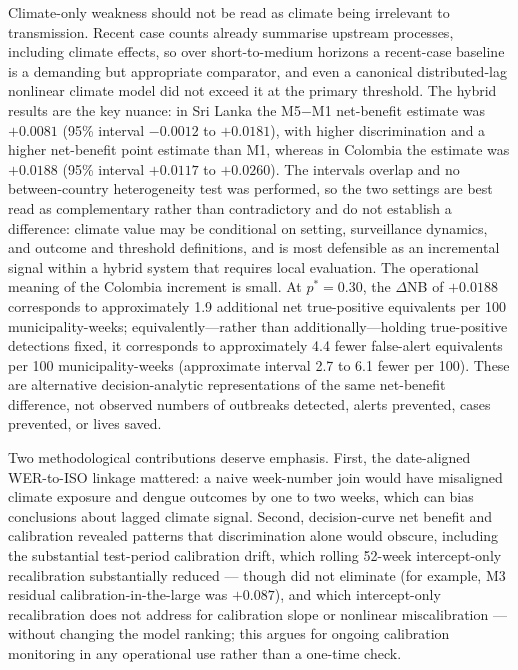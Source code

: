 \documentclass[11pt,a4paper]{article}
\begin{document}
Climate-only weakness should not be read as climate being irrelevant to transmission. Recent case counts already summarise upstream processes, including climate effects, so over short-to-medium horizons a recent-case baseline is a demanding but appropriate comparator, and even a canonical distributed-lag nonlinear climate model did not exceed it at the primary threshold. The hybrid results are the key nuance: in Sri Lanka the M5$-$M1 net-benefit estimate was $+0.0081$ (95\% interval $-0.0012$ to $+0.0181$), with higher discrimination and a higher net-benefit point estimate than M1, whereas in Colombia the estimate was $+0.0188$ (95\% interval $+0.0117$ to $+0.0260$). The intervals overlap and no between-country heterogeneity test was performed, so the two settings are best read as complementary rather than contradictory and do not establish a difference: climate value may be conditional on setting, surveillance dynamics, and outcome and threshold definitions, and is most defensible as an incremental signal within a hybrid system that requires local evaluation. The operational meaning of the Colombia increment is small. At $p^*=0.30$, the $\Delta$NB of $+0.0188$ corresponds to approximately 1.9 additional net true-positive equivalents per 100 municipality-weeks; equivalently---rather than additionally---holding true-positive detections fixed, it corresponds to approximately 4.4 fewer false-alert equivalents per 100 municipality-weeks (approximate interval 2.7 to 6.1 fewer per 100). These are alternative decision-analytic representations of the same net-benefit difference, not observed numbers of outbreaks detected, alerts prevented, cases prevented, or lives saved.

Two methodological contributions deserve emphasis. First, the date-aligned WER-to-ISO linkage mattered: a naive week-number join would have misaligned climate exposure and dengue outcomes by one to two weeks, which can bias conclusions about lagged climate signal. Second, decision-curve net benefit and calibration revealed patterns that discrimination alone would obscure, including the substantial test-period calibration drift, which rolling 52-week intercept-only recalibration substantially reduced --- though did not eliminate (for example, M3 residual calibration-in-the-large was $+0.087$), and which intercept-only recalibration does not address for calibration slope or nonlinear miscalibration --- without changing the model ranking; this argues for ongoing calibration monitoring in any operational use rather than a one-time check.
\end{document}
